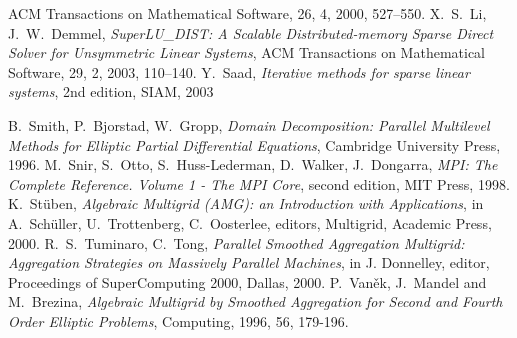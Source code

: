 \begin{thebibliography}{99}
ACM Transactions on Mathematical Software, 26, 4, 2000, 527--550.
X.~S.~Li, J.~W.~Demmel, {\em SuperLU\_DIST: A Scalable Distributed-memory Sparse Direct Solver for Unsymmetric Linear Systems},
ACM Transactions on Mathematical Software, 29, 2, 2003, 110--140.
%
%
%
%
Y.~Saad,
\emph{Iterative methods for sparse linear systems}, 2nd edition,
SIAM, 2003

B.~Smith, P.~Bjorstad, W.~Gropp,
{\em Domain Decomposition: Parallel Multilevel Methods for Elliptic
Partial Differential Equations},
Cambridge University Press, 1996.
%
M.~Snir, S.~Otto, S.~Huss-Lederman, D.~Walker, J.~Dongarra,
{\em MPI: The Complete Reference. Volume 1 - The MPI Core}, second edition,
MIT Press, 1998.
%
K.~St\"{u}ben,
{\em Algebraic Multigrid (AMG): an Introduction with Applications},
in A.~Sch\"{u}ller, U.~Trottenberg, C.~Oosterlee, editors, Multigrid,
Academic Press, 2000.
%
R.~S.~Tuminaro, C.~Tong,
{\em Parallel Smoothed Aggregation Multigrid: Aggregation Strategies on Massively Parallel Machines},
in J. Donnelley, editor, Proceedings of SuperComputing 2000, Dallas, 2000.
%
P.~Van{\v e}k, J.~Mandel and M.~Brezina,
{\em Algebraic Multigrid by Smoothed Aggregation for Second and Fourth Order Elliptic Problems},
Computing, 1996, 56, 179-196.
%

\end{thebibliography}
